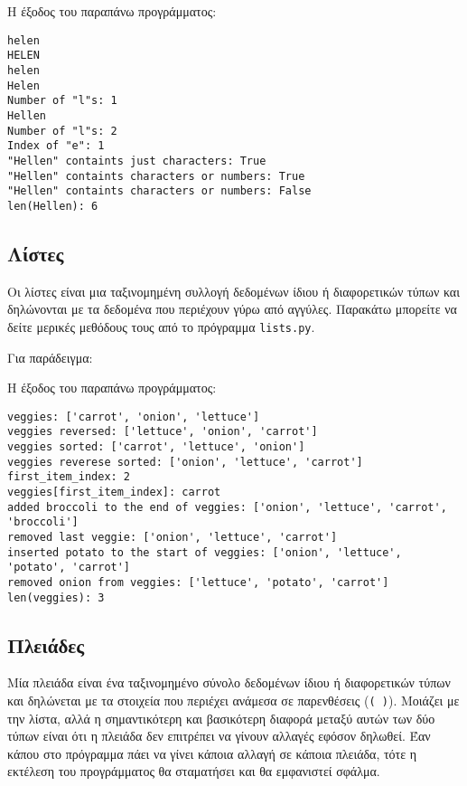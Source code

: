 \documentclass[14pt]{extreport}
\begin{document}


Η έξοδος του παραπάνω προγράμματος:

\begin{lstlisting}[language={}]
helen
HELEN
helen
Helen
Number of "l"s: 1
Hellen
Number of "l"s: 2
Index of "e": 1
"Hellen" containts just characters: True
"Hellen" containts characters or numbers: True
"Hellen" containts characters or numbers: False
len(Hellen): 6
\end{lstlisting}


\subsection{Λίστες}
Οι λίστες είναι μια ταξινομημένη συλλογή δεδομένων ίδιου ή διαφορετικών τύπων και δηλώνονται με τα δεδομένα που περιέχουν γύρω από αγγύλες. Παρακάτω μπορείτε να δείτε μερικές μεθόδους τους από το πρόγραμμα \lstinline{lists.py}.

Για παράδειγμα:



Η έξοδος του παραπάνω προγράμματος:

\begin{lstlisting}[language={}]
veggies: ['carrot', 'onion', 'lettuce']
veggies reversed: ['lettuce', 'onion', 'carrot']
veggies sorted: ['carrot', 'lettuce', 'onion']
veggies reverese sorted: ['onion', 'lettuce', 'carrot']
first_item_index: 2
veggies[first_item_index]: carrot
added broccoli to the end of veggies: ['onion', 'lettuce', 'carrot', 'broccoli']
removed last veggie: ['onion', 'lettuce', 'carrot']
inserted potato to the start of veggies: ['onion', 'lettuce', 'potato', 'carrot']
removed onion from veggies: ['lettuce', 'potato', 'carrot']
len(veggies): 3
\end{lstlisting}

\subsection{Πλειάδες}
Μία πλειάδα είναι ένα ταξινομημένο σύνολο δεδομένων ίδιου ή διαφορετικών τύπων και δηλώνεται με τα στοιχεία που περιέχει ανάμεσα σε παρενθέσεις (\lstinline[language={}]{( )}). Μοιάζει με την λίστα, αλλά η σημαντικότερη και βασικότερη διαφορά μεταξύ αυτών των δύο τύπων είναι ότι η πλειάδα δεν επιτρέπει να γίνουν αλλαγές εφόσον δηλωθεί. Έαν κάπου στο πρόγραμμα πάει να γίνει κάποια αλλαγή σε κάποια πλειάδα, τότε η εκτέλεση του προγράμματος θα σταματήσει και θα εμφανιστεί σφάλμα.
\end{document}
